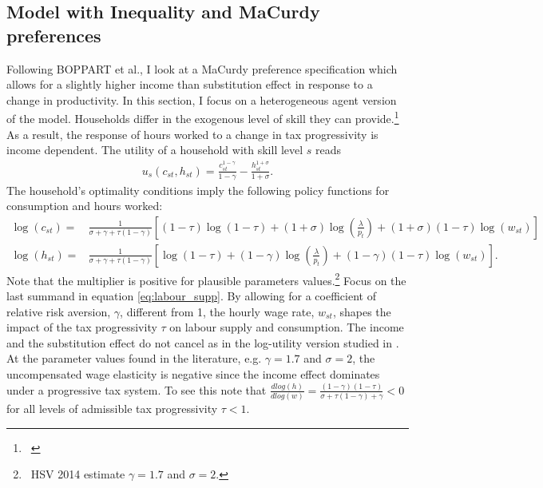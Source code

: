 \subsection{Model with Inequality and MaCurdy preferences}
Following BOPPART et al., I look at a MaCurdy preference specification which allows for a slightly higher income than substitution effect in response to a change in productivity. In this section, I focus on a heterogeneous agent version of the model. Households differ in the exogenous level of skill they can provide.\footnote{\  } As a result, the response of hours worked to a change in tax progressivity is income dependent. 
The utility of a household with skill level $s$ reads
\begin{align}
	u_s(c_{st},h_{st})=
	\frac{c_{st}^{1-\gamma}}{1-\gamma}-
	\frac{h_{st}^{1+\sigma}}{1+\sigma}.%
\end{align}
The household's optimality conditions imply the following policy functions for consumption and hours worked:
\begin{align}
	\log(c_{st})=& \frac{1}{\sigma +\gamma +\tau(1-\gamma)}\left[(1-\tau)\log(1-\tau)+(1+\sigma)\log\left(\frac{\lambda}{p_{t}}\right)+(1+\sigma)(1-\tau)\log(w_{st})\right]\\
		\log(h_{st})=& \frac{1}{\sigma+\gamma+\tau(1-\gamma)}\left[\log(1-\tau)+(1-\gamma)\log\left(\frac{\lambda}{p_{t}}\right)+(1-\gamma)(1-\tau)\log(w_{st})\right]\label{eq:labour_supp}.
\end{align}
Note that the multiplier is positive for plausible parameters values.\footnote{\ HSV 2014 estimate $\gamma= 1.7$ and $\sigma=2$.} %
Focus on the last summand in equation \ref{eq:labour_supp}.
By allowing for a coefficient of relative risk aversion, $\gamma$, different from 1, the hourly wage rate, $w_{st}$, shapes the impact of the tax progressivity $\tau$ on labour supply and consumption. The income and the substitution effect do not cancel as in the log-utility version studied in \cite{Heathcote2017OptimalFramework}. 
 At the parameter values found in the literature, e.g. $\gamma= 1.7$ and $\sigma=2$, the uncompensated wage elasticity is negative since the income effect dominates under a progressive tax system.  To see this note that  $\frac{d log(h)}{d log(w)}= \frac{(1-\gamma)(1-\tau)}{\sigma+\tau(1-\gamma)+\gamma}<0$ for all levels of admissible tax progressivity $\tau<1$.  
